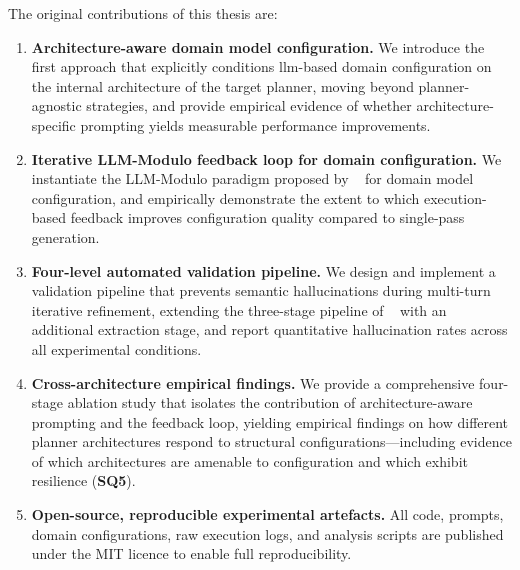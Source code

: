 The original contributions of this thesis are:

\begin{enumerate}
  \item \textbf{Architecture-aware domain model configuration.}
        We introduce the first approach that explicitly conditions \gls{llm}-based domain configuration on the internal architecture of the target planner, moving beyond planner-agnostic strategies, and provide empirical evidence of whether architecture-specific prompting yields measurable performance improvements.

  \item \textbf{Iterative LLM-Modulo feedback loop for domain configuration.}
        We instantiate the LLM-Modulo paradigm proposed by \citeauthor{Kambhampati2024}~\cite{Kambhampati2024} for domain model configuration, and empirically demonstrate the extent to which execution-based feedback improves configuration quality compared to single-pass generation.

  \item \textbf{Four-level automated validation pipeline.}
        We design and implement a validation pipeline that prevents semantic hallucinations during multi-turn iterative refinement, extending the three-stage pipeline of \citeauthor{Georgievski2025}~\cite{Georgievski2025} with an additional extraction stage, and report quantitative hallucination rates across all experimental conditions.

  \item \textbf{Cross-architecture empirical findings.}
        We provide a comprehensive four-stage ablation study that isolates the contribution of architecture-aware prompting and the feedback loop, yielding empirical findings on how different planner architectures respond to structural configurations---including evidence of which architectures are amenable to configuration and which exhibit resilience (\textbf{SQ5}).

  \item \textbf{Open-source, reproducible experimental artefacts.}
        All code, prompts, domain configurations, raw execution logs, and analysis scripts are published under the MIT licence to enable full reproducibility.
\end{enumerate}

